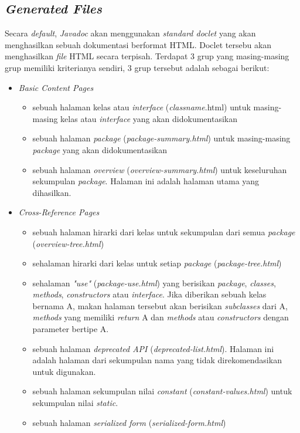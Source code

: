 \subsection{\textit{Generated Files}}
\label{sec:generated-files}
Secara {\it default}, {\it Javadoc} akan menggunakan {\it standard doclet} yang akan menghasilkan sebuah dokumentasi berformat HTML. Doclet tersebu akan menghasilkan {\it file} HTML secara terpisah. Terdapat 3 grup yang masing-masing grup memiliki kriterianya sendiri, 3 grup tersebut adalah sebagai berikut:
\begin{itemize}
	\item {\it Basic Content Pages}
	\begin{itemize}
		\item sebuah halaman kelas atau {\it interface} ({\it classname}.html) untuk masing-masing kelas atau {\it interface} yang akan didokumentasikan
		\item sebuah halaman {\it package} ({\it package-summary.html}) untuk masing-masing {\it package} yang akan didokumentasikan
		\item sebuah halaman {\it overview} ({\it overview-summary.html}) untuk keseluruhan sekumpulan {\it package}. Halaman ini adalah halaman utama yang dihasilkan.
	\end{itemize}
	\item {\it Cross-Reference Pages}
	\begin{itemize}
		\item sebuah halaman hirarki dari kelas untuk sekumpulan dari semua {\it package} ({\it overview-tree.html})
		\item sehalaman hirarki dari kelas untuk setiap {\it package} ({\it package-tree.html})
		\item sehalaman {\it "use"} ({\it package-use.html}) yang berisikan {\it package}, {\it classes}, {\it methods}, {\it constructors} atau {\it interface}. Jika diberikan sebuah kelas bernama A, makan halaman tersebut akan berisikan {\it subclasses} dari A, {\it methods} yang memiliki {\it return} A dan {\it methods} atau {\it constructors} dengan parameter bertipe A.
		\item sebuah halaman {\it deprecated API} ({\it deprecated-list.html}). Halaman ini adalah halaman dari sekumpulan nama yang tidak direkomendasikan untuk digunakan.
		\item sebuah halaman sekumpulan nilai {\it constant} ({\it constant-values.html}) untuk sekumpulan nilai {\it static}.
		\item sebuah halaman {\it serialized form} ({\it serialized-form.html})

\end{itemize}
\end{itemize}
